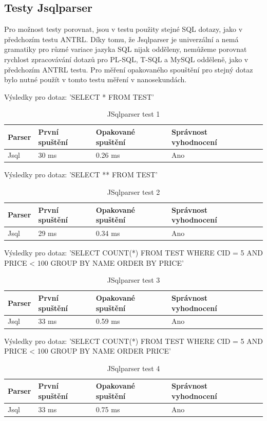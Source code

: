 \documentclass[czech,bachelor,public,dept460,male,cpdeclaration,twoside]{diploma}
\begin{document}
\subsection{Testy Jsqlparser}
Pro možnost testy porovnat, jsou v testu použity stejné SQL dotazy, jako v předchozím testu ANTRL. Díky tomu, že Jsqlparser je univerzální a nemá gramatiky pro různé variace jazyka SQL nijak odděleny, nemůžeme porovnat rychlost zpracovávání dotazů pro PL-SQL, T-SQL a MySQL odděleně, jako v předchozím ANTRL testu. Pro měření opakovaného spouštění pro stejný dotaz bylo nutné použít v tomto testu měření v nanosekundách.

\begin{table}[!htbp]
	\centering
	\caption{JSqlparser test 1}
	Výsledky pro dotaz: 'SELECT * FROM TEST'
	\vskip 0.1cm
	\label{tab:jsql1}
	\begin{tabular}{lllll}
		\toprule
		Parser & První spuštění & Opakované spuštění & Správnost vyhodnocení\\
		\midrule
		Jsql & 30 ms & 0.26 ms & Ano \\
		\midrule
	\end{tabular}
\end{table}

\begin{table}[!htbp]
	\centering
	\caption{JSqlparser test 2}
	Výsledky pro dotaz: 'SELECT ** FROM TEST'
	\vskip 0.1cm
	\label{tab:jsql2}
	\begin{tabular}{lllll}
		\toprule
		Parser & První spuštění & Opakované spuštění & Správnost vyhodnocení\\
		\midrule
		Jsql & 29 ms & 0.34 ms & Ano \\
		\midrule
	\end{tabular}
\end{table}

\begin{table}[!htbp]
	\centering
	\caption{JSqlparser test 3}
	Výsledky pro dotaz: 'SELECT COUNT(*) FROM TEST WHERE CID = 5 AND PRICE < 100 GROUP BY NAME ORDER BY PRICE'
	\vskip 0.1cm
	\label{tab:jsql3}
	\begin{tabular}{lllll}
		\toprule
		Parser & První spuštění & Opakované spuštění & Správnost vyhodnocení\\
		\midrule
		Jsql & 33 ms & 0.59 ms & Ano \\
		\midrule
	\end{tabular}
\end{table}

\begin{table}[!htbp]
	\centering
	\caption{JSqlparser test 4}
	Výsledky pro dotaz: 'SELECT COUNT(*) FROM TEST WHERE CID = 5 AND PRICE < 100 GROUP BY NAME ORDER PRICE'
	\vskip 0.1cm
	\label{tab:jsql4}
	\begin{tabular}{lllll}
		\toprule
		Parser & První spuštění & Opakované spuštění & Správnost vyhodnocení\\
		\midrule
		Jsql & 33 ms & 0.75 ms & Ano \\
		\midrule
	\end{tabular}
\end{table}
\end{document}
